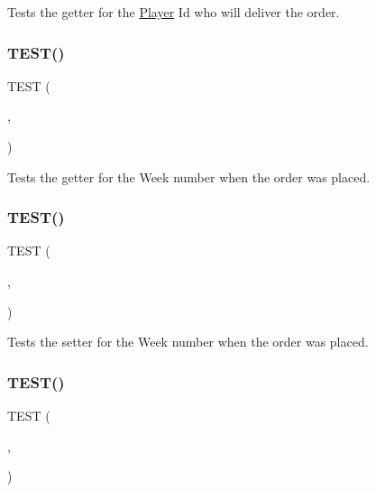 Tests the getter for the \hyperlink{classPlayer}{Player} Id who will deliver the order. \mbox{\label{group__group2_gaa446fcfe29aea8d8da3faf1358adb8d8}} 
\subsubsection{\texorpdfstring{T\+E\+S\+T()}{TEST()}\hspace{0.1cm}{\footnotesize\ttfamily [46/54]}}
{\footnotesize\ttfamily T\+E\+ST (\begin{DoxyParamCaption}\item[{order\+Test}]{,  }\item[{get\+Ordered\+In\+Week\+Test}]{ }\end{DoxyParamCaption})}

Tests the getter for the Week number when the order was placed. \mbox{\label{group__group2_ga11d261312827fd420cf539dacc3541ab}} 
\subsubsection{\texorpdfstring{T\+E\+S\+T()}{TEST()}\hspace{0.1cm}{\footnotesize\ttfamily [47/54]}}
{\footnotesize\ttfamily T\+E\+ST (\begin{DoxyParamCaption}\item[{order\+Test}]{,  }\item[{set\+Ordered\+In\+Week\+Test}]{ }\end{DoxyParamCaption})}

Tests the setter for the Week number when the order was placed. \mbox{\label{group__group2_ga49212cac71e8668f4cfc4e3f9120d41c}} 
\subsubsection{\texorpdfstring{T\+E\+S\+T()}{TEST()}\hspace{0.1cm}{\footnotesize\ttfamily [48/54]}}
{\footnotesize\ttfamily T\+E\+ST (\begin{DoxyParamCaption}\item[{order\+Test}]{,  }\item[{get\+Shipped\+In\+Week\+Test}]{ }\end{DoxyParamCaption})}

